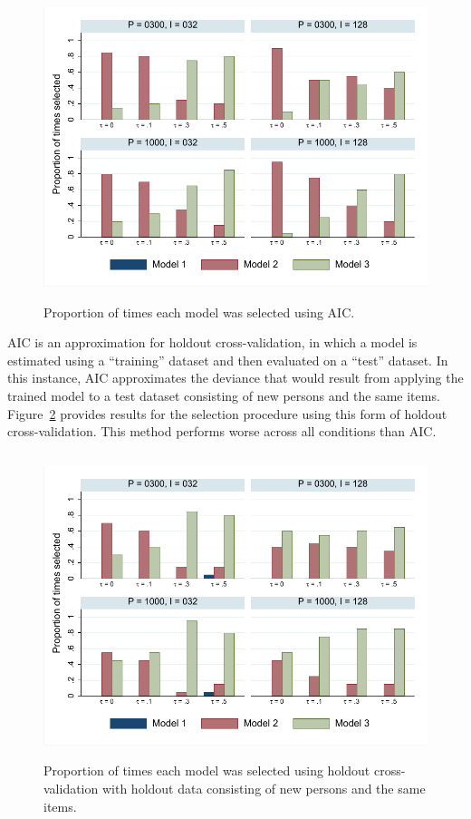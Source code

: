 \documentclass[12pt, letterpaper]{article}
\begin{document}
\begin{figure}[htbp]
	\centering
	\includegraphics[height=3.5in, trim = 1mm 1mm 1mm 1mm, clip=true]
		{chapter_2/figs/p_aic.pdf}
	\caption{Proportion of times each model was selected using AIC.}
	\label{fig:aic-bar}
\end{figure}

AIC is an approximation for holdout cross-validation, in which a model is estimated using a ``training'' dataset and then evaluated on a ``test'' dataset. In this instance, AIC approximates the deviance that would result from applying the trained model to a test dataset consisting of new persons and the same items.  Figure~\ref{fig:person-bar} provides results for the selection procedure using this form of holdout cross-validation. This method performs worse across all conditions than AIC.

\begin{figure}[htbp]
	\centering
	\includegraphics[height=3.5in, trim = 1mm 1mm 1mm 1mm, clip=true]
		{chapter_2/figs/p_new_person_same_item.pdf}
	\caption{Proportion of times each model was selected using holdout cross-validation with holdout data consisting of new persons and the same items.}
	\label{fig:person-bar}
\end{figure}
\end{document}
